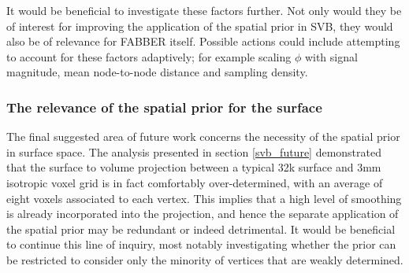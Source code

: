 It would be beneficial to investigate these factors further. Not only would they be of interest for improving the application of the spatial prior in SVB, they would also be of relevance for FABBER itself. Possible actions could include attempting to account for these factors adaptively; for example scaling $\phi$ with signal magnitude, mean node-to-node distance and sampling density. 

\subsubsection{The relevance of the spatial prior for the surface}

The final suggested area of future work concerns the necessity of the spatial prior in surface space. The analysis presented in section \ref{svb_future} demonstrated that the surface to volume projection between a typical 32k surface and 3mm isotropic voxel grid is in fact comfortably over-determined, with an average of eight voxels associated to each vertex. This implies that a high level of smoothing is already incorporated into the projection, and hence the separate application of the spatial prior may be redundant or indeed detrimental. It would be beneficial to continue this line of inquiry, most notably investigating whether the prior can be restricted to consider only the minority of vertices that are weakly determined. 
